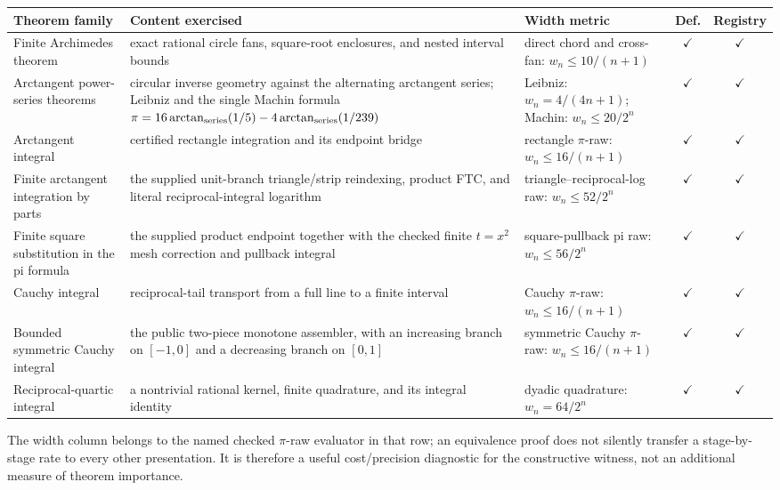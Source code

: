 \begin{center}
\begin{tabular}{@{}p{}p{}p{}cc@{}}
\textbf{Theorem family} & \textbf{Content exercised} &
\textbf{Width metric} & \textbf{Def.} & \textbf{Registry}\\
\hline
Finite Archimedes theorem &
exact rational circle fans, square-root enclosures, and nested interval bounds &
direct chord and cross-fan: \(w_n\le 10/(n+1)\) &
\(\checkmark\) & \(\checkmark\)\\
Arctangent power-series theorems &
circular inverse geometry against the alternating arctangent series;
Leibniz and the single Machin formula
\(\pi=16\arctan_{\rm series}(1/5)-4\arctan_{\rm series}(1/239)\) &
Leibniz: \(w_n=4/(4n+1)\); Machin: \(w_n\le20/2^n\) &
\(\checkmark\) & \(\checkmark\)\\
Arctangent integral &
certified rectangle integration and its endpoint bridge &
rectangle \(\pi\)-raw: \(w_n\le16/(n+1)\) &
\(\checkmark\) & \(\checkmark\)\\
Finite arctangent integration by parts &
the supplied unit-branch triangle/strip reindexing, product FTC, and
literal reciprocal-integral logarithm &
triangle--reciprocal-log raw: \(w_n\le52/2^n\) &
\(\checkmark\) & \(\checkmark\)\\
Finite square substitution in the pi formula &
the supplied product endpoint together with the checked finite
\(t=x^2\) mesh correction and pullback integral &
square-pullback pi raw: \(w_n\le56/2^n\) &
\(\checkmark\) & \(\checkmark\)\\
Cauchy integral &
reciprocal-tail transport from a full line to a finite interval &
Cauchy \(\pi\)-raw: \(w_n\le16/(n+1)\) &
\(\checkmark\) & \(\checkmark\)\\
Bounded symmetric Cauchy integral &
the public two-piece monotone assembler, with an increasing branch on
\([-1,0]\) and a decreasing branch on \([0,1]\) &
symmetric Cauchy \(\pi\)-raw: \(w_n\le16/(n+1)\) &
\(\checkmark\) & \(\checkmark\)\\
Reciprocal-quartic integral &
a nontrivial rational kernel, finite quadrature, and its integral identity &
dyadic quadrature: \(w_n=64/2^n\) &
\(\checkmark\) & \(\checkmark\)\\
\end{tabular}
\end{center}
 
The width column belongs to the named checked \(\pi\)-raw evaluator in that
row; an equivalence proof does not silently transfer a stage-by-stage rate to
every other presentation.  It is therefore a useful cost/precision diagnostic
for the constructive witness, not an additional measure of theorem importance.

